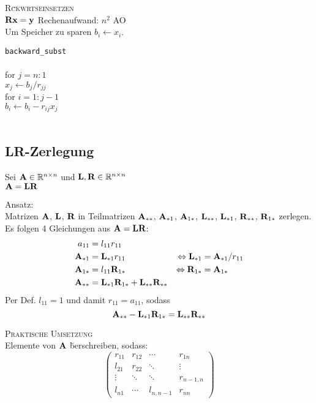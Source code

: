 \textsc{R\u ckw\a rtseinsetzen}\\
\centering $\mbox{\bf Rx}=\mbox{\bf y}$ \flushleft 
Rechenaufwand: $n^2$ AO \\
Um Speicher zu sparen  $b_i \leftarrow x_i$.\vspace{0.2cm}

\verb!backward_subst!\\
{\addtolength{\leftskip}{0mm}
\hrulefill\\
for $j=n:1$\\
\quad $x_j \leftarrow b_j/r_{jj}$\\
\quad for $i=1:j-1$\\
\qquad $b_i \leftarrow b_i-r_{ij}x_j$\\
\hrulefill\\
}\vspace{0.2cm}

\subsection{LR-Zerlegung}
Sei $\mbox{\bf A} \in \mathbb{R}^{n \times n}$ und $\mbox{\bf L},\mbox{\bf R} \in \mathbb{R}^{n \times n}$\\
\centering $\mbox{\bf A}=\mbox{\bf LR}$ \flushleft

Ansatz: \\
Matrizen $\mbox{\bf A}$, $\mbox{\bf L}$, $\mbox{\bf R}$ in Teilmatrizen $\mbox{\bf A}_{**}$, $\mbox{\bf A}_{*1}$, $\mbox{\bf A}_{1*}$, $\mbox{\bf L}_{**}$, $\mbox{\bf L}_{*1}$, $\mbox{\bf R}_{**}$, $\mbox{\bf R}_{1*}$ zerlegen.\\ Es folgen 4 Gleichungen aus $\mbox{\bf A}=\mbox{\bf LR}$:
\begin{align*}
a_{11}     &= l_{11}r_{11} & & \\
\mbox{\bf A}_{*1} &= \mbox{\bf L}_{*1}r_{11} &\Leftrightarrow \mbox{\bf L}_{*1} &= \mbox{\bf A}_{*1}/r_{11} \\ 
\mbox{\bf A}_{1*} &= l_{11}\mbox{\bf R}_{1*} &\Leftrightarrow \mbox{\bf R}_{1*} &= \mbox{\bf A}_{1*}\\
\mbox{\bf A}_{**} &= \mbox{\bf L}_{*1}\mbox{\bf R}_{1*}+\mbox{\bf L}_{**}\mbox{\bf R}_{**} & &
\end{align*}
Per Def. $l_{11}=1$ und damit $r_{11}=a_{11}$, sodass
\begin{equation}
\mbox{\bf A}_{**} - \mbox{\bf L}_{*1}\mbox{\bf R}_{1*} = \mbox{\bf L}_{**}\mbox{\bf R}_{**}
\end{equation}

\textsc{Praktische Umsetzung}\\
Elemente von $\mbox{\bf A}$ \u berschreiben, sodass:
\begin{equation}
\begin{pmatrix}
r_{11} & r_{12} & \cdots    & r_{1n} \\
l_{21} & r_{22} & \ddots    & \vdots \\
\vdots & \ddots & \ddots    & r_{n-1,n} \\
l_{n1} & \cdots & l_{n,n-1} & r_{nn} 
\end{pmatrix}
\end{equation}


